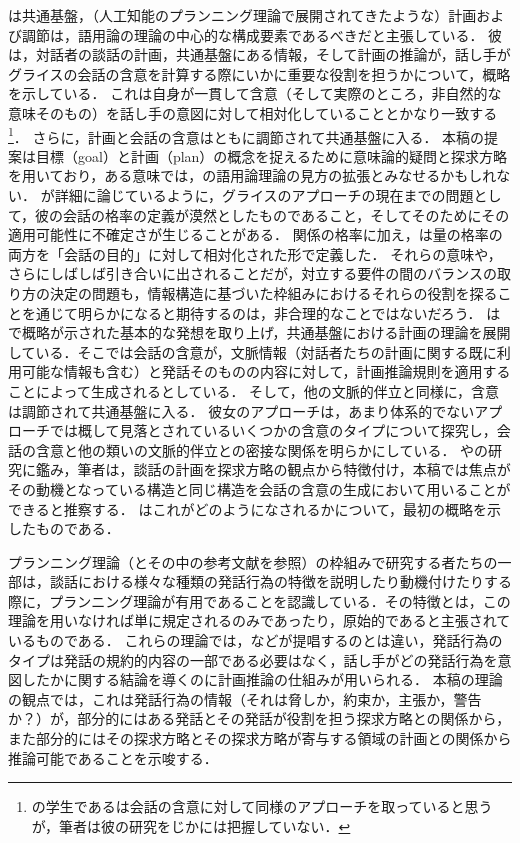 \documentclass{goken}
\newcommand{\term}[2]{\textsf{#1}（#2）}
\newcommand{\ori}[1]{\noindent\textcolor[gray]{0.7}{\fontsize{8pt}{8pt}\selectfont{\textsf{(p.~#1)}}} }
\begin{document}
\citet{Thomason1990}は共通基盤，（人工知能のプランニング理論で展開されてきたような）計画および調節は，語用論の理論の中心的な構成要素であるべきだと主張している．
彼は，対話者の談話の計画，共通基盤にある情報，そして計画の推論が，話し手がグライスの会話の含意を計算する際にいかに重要な役割を担うかについて，概略を示している．
これは\citeauthor{Grice1989}自身が一貫して含意（そして実際のところ，非自然的な意味そのもの）を話し手の意図に対して相対化していることとかなり一致する
\footnote{%
  \citeauthor{Thomason1990}の学生である\citet{McCafferty1987}は会話の含意に対して同様のアプローチを取っていると思うが，筆者は彼の研究をじかには把握していない．
}．
さらに，計画と会話の含意はともに調節されて共通基盤に入る．
本稿の提案は\term{目標}{goal}と\term{計画}{plan}の概念を捉えるために意味論的疑問と探求方略を用いており，ある意味では，\citeauthor{Thomason1990}の語用論理論の見方の拡張とみなせるかもしれない．
\citet{SperberWilson1986}が詳細に論じているように，グライスのアプローチの現在までの問題として，彼の会話の格率の定義が漠然としたものであること，そしてそのためにその適用可能性に不確定さが生じることがある．
関係の格率に加え，\citeauthor{Grice1989}は量の格率の両方を「会話の目的」に対して相対化された形で定義した．
それらの意味や，さらにしばしば引き合いに出されることだが，対立する要件の間のバランスの取り方の決定の問題も，情報構造に基づいた枠組みにおけるそれらの役割を探ることを通じて明らかになると期待するのは，非合理的なことではないだろう．
\citet{Welker1994}は\citealt{Thomason1990}で概略が示された基本的な発想を取り上げ，共通基盤における計画の理論を展開している．そこでは会話の含意が，文脈情報（対話者たちの計画に関する既に利用可能な情報も含む）と発話そのものの内容に対して，計画推論規則を適用することによって生成されるとしている．
そして，他の文脈的伴立と同様に，含意は調節されて共通基盤に入る．
彼女のアプローチは，あまり体系的でないアプローチでは概して見落とされているいくつかの含意のタイプについて探究し，会話の含意と他の類いの文脈的伴立との密接な関係を明らかにしている．
\citeauthor{Thomason1990}や\citeauthor{Welker1994}の研究に鑑み，筆者は，談話の計画を探求方略の観点から特徴付け，本稿では焦点がその動機となっている構造と同じ構造を会話の含意の生成において用いることができると推察する．
\ori{61}
\citet{Roberts1996c}はこれがどのようになされるかについて，最初の概略を示したものである．

プランニング理論（\citealt{Perrault1990}とその中の参考文献を参照）の枠組みで研究する者たちの一部は，談話における様々な種類の発話行為の特徴を説明したり動機付けたりする際に，プランニング理論が有用であることを認識している．その特徴とは，この理論を用いなければ単に規定されるのみであったり，原始的であると主張されているものである．
これらの理論では，\citet{Searle1969}などが提唱するのとは違い，発話行為のタイプは発話の規約的内容の一部である必要はなく，話し手がどの発話行為を意図したかに関する結論を導くのに計画推論の仕組みが用いられる．
本稿の理論の観点では，これは発話行為の情報（それは脅しか，約束か，主張か，警告か？）が，部分的にはある発話とその発話が役割を担う探求方略との関係から，また部分的にはその探求方略とその探求方略が寄与する領域の計画との関係から推論可能であることを示唆する．
\end{document}
